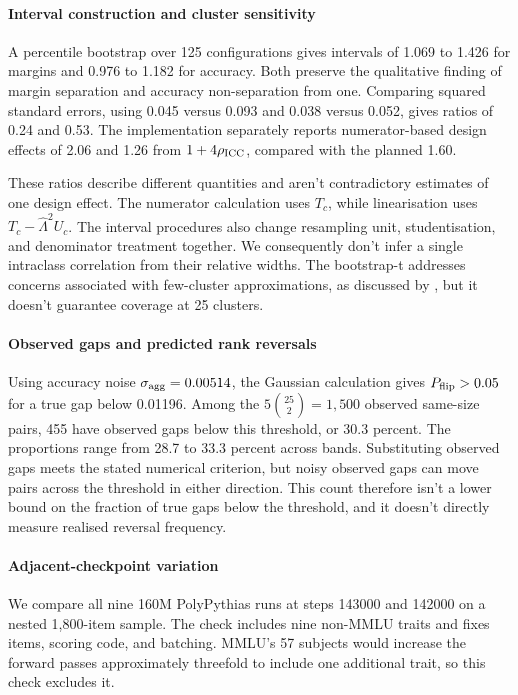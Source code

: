 \paragraph{Interval construction and cluster sensitivity}
A percentile bootstrap over 125 configurations gives intervals of 1.069 to 1.426 for margins and 0.976 to 1.182 for accuracy. Both preserve the qualitative finding of margin separation and accuracy non-separation from one. Comparing squared standard errors, using 0.045 versus 0.093 and 0.038 versus 0.052, gives ratios of 0.24 and 0.53. The implementation separately reports numerator-based design effects of 2.06 and 1.26 from $1+4\rho_{\rm ICC}$, compared with the planned 1.60.

These ratios describe different quantities and aren't contradictory estimates of one design effect. The numerator calculation uses $T_c$, while linearisation uses $T_c-\widehat\Lambda^2U_c$. The interval procedures also change resampling unit, studentisation, and denominator treatment together. We consequently don't infer a single intraclass correlation from their relative widths. The bootstrap-t addresses concerns associated with few-cluster approximations, as discussed by \citet{bell2002}, but it doesn't guarantee coverage at 25 clusters.

\paragraph{Observed gaps and predicted rank reversals}
Using accuracy noise $\sigma_{\rm agg}=0.00514$, the Gaussian calculation gives $P_{\rm flip}>0.05$ for a true gap below 0.01196. Among the $5\binom{25}{2}=1{,}500$ observed same-size pairs, 455 have observed gaps below this threshold, or 30.3 percent. The proportions range from 28.7 to 33.3 percent across bands. Substituting observed gaps meets the stated numerical criterion, but noisy observed gaps can move pairs across the threshold in either direction. This count therefore isn't a lower bound on the fraction of true gaps below the threshold, and it doesn't directly measure realised reversal frequency.

\paragraph{Adjacent-checkpoint variation}
We compare all nine 160M PolyPythias runs at steps 143000 and 142000 on a nested 1,800-item sample. The check includes nine non-MMLU traits and fixes items, scoring code, and batching. MMLU's 57 subjects would increase the forward passes approximately threefold to include one additional trait, so this check excludes it.

